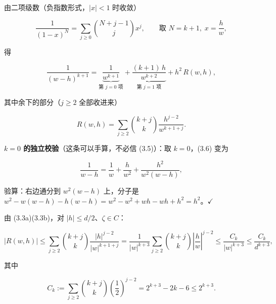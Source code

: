 \documentclass[11pt]{ctexart}
\let\origsubhdr\subhdr
\renewcommand{\subhdr}[1]{\par\origsubhdr{#1}}
\begin{document}
由二项级数（负指数形式，$|x|<1$ 时收敛）

\begin{equation}
\frac{1}{(1-x)^{N}}=\sum_{j\ge0}\binom{N+j-1}{j}x^{j},
\qquad\text{取 }N=k+1,\;x=\frac{h}{w},
\tag{3.5}
\end{equation}

得

\begin{equation}
\frac{1}{(w-h)^{k+1}}
=\underbrace{\frac{1}{w^{k+1}}}_{\text{第 }j=0\text{ 项}}
+\underbrace{\frac{(k+1)\,h}{w^{k+2}}}_{\text{第 }j=1\text{ 项}}
+h^{2}\,R(w,h),
\tag{3.6}
\end{equation}

其中余下的部分（$j\ge2$ 全部收进来）

\begin{equation}
R(w,h)=\sum_{j\ge2}\binom{k+j}{k}\frac{h^{j-2}}{w^{k+1+j}} .
\tag{3.7}
\end{equation}


\noindent\textbf{$k=0$ 的独立校验}（这条可以手算，不必信 (3.5)）：取 $k=0$，(3.6) 变为

\begin{equation}
\frac{1}{w-h}=\frac{1}{w}+\frac{h}{w^{2}}+\frac{h^{2}}{w^{2}(w-h)},
\tag{3.8}
\end{equation}

验算：右边通分到 $w^2(w-h)$ 上，分子是 $w^2-w(w-h)-h(w-h)=w^{2}-w^{2}+wh-wh+h^{2}=h^{2}$。$\checkmark$



由 (3.3a)(3.3b)，对 $|h|\le d/2$、$\zeta\in C$：

\begin{equation}
|R(w,h)|
\le\sum_{j\ge2}\binom{k+j}{k}\frac{|h|^{j-2}}{|w|^{k+1+j}}
=\frac{1}{|w|^{k+3}}\sum_{j\ge2}\binom{k+j}{k}\left|\frac{h}{w}\right|^{j-2}
\le\frac{C_k}{|w|^{k+3}}\le\frac{C_k}{d^{k+3}},
\tag{3.9}
\end{equation}

其中

\begin{equation}
C_k:=\sum_{j\ge2}\binom{k+j}{k}\left(\frac12\right)^{j-2}=2^{k+3}-2k-6\le 2^{k+3}.
\tag{3.10}
\end{equation}
\end{document}
